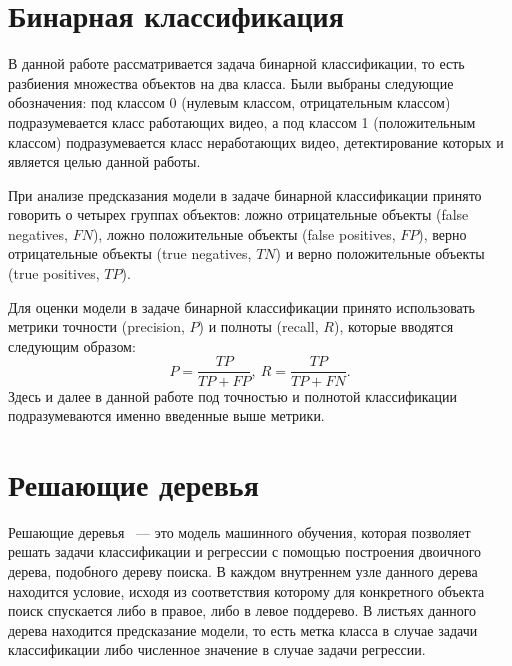 \section{Бинарная классификация}

В данной работе рассматривается задача бинарной классификации, то есть разбиения множества объектов на два класса. Были выбраны следующие обозначения: под классом 0 (нулевым классом, отрицательным классом) подразумевается класс работающих видео, а под классом 1 (положительным классом) подразумевается класс неработающих видео, детектирование которых и является целью данной работы.

При анализе предсказания модели в задаче бинарной классификации принято говорить о четырех группах объектов: ложно отрицательные объекты (false negatives, $FN$), ложно положительные объекты (false positives, $FP$), верно отрицательные объекты (true negatives, $TN$) и верно положительные объекты (true positives, $TP$).

Для оценки модели в задаче бинарной классификации принято использовать метрики точности (precision, $P$) и полноты (recall, $R$), которые вводятся следующим образом:
\[
    P = \frac{TP}{TP + FP},\ R = \frac{TP}{TP + FN}.
\]
Здесь и далее в данной работе под точностью и полнотой классификации подразумеваются именно введенные выше метрики.

\section{Решающие деревья}

Решающие деревья \cite{Breiman2017}~--- это модель машинного обучения, которая позволяет решать задачи классификации и регрессии с помощью построения двоичного дерева, подобного дереву поиска. В каждом внутреннем узле данного дерева находится условие, исходя из соответствия которому для конкретного объекта поиск спускается либо в правое, либо в левое поддерево. В листьях данного дерева находится предсказание модели, то есть метка класса в случае задачи классификации либо численное значение в случае задачи регрессии.

